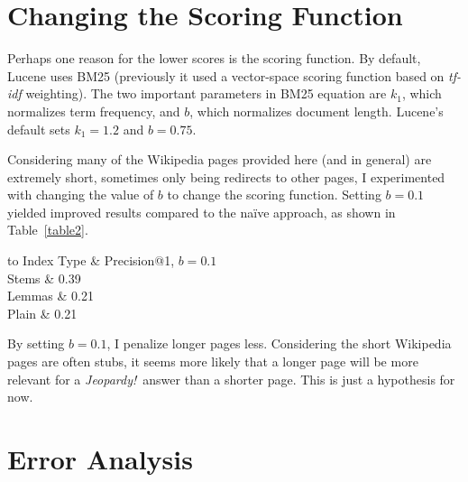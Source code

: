 \documentclass[11pt,letterpaper]{article}
\begin{document}
\section{Changing the Scoring Function}

Perhaps one reason for the lower scores is the scoring function.
By default, Lucene uses BM25 (previously it used a vector-space scoring function based on \textit{tf-idf} weighting).
The two important parameters in BM25 equation are $k_1$, which normalizes term frequency, and $b$, which normalizes document length.
Lucene's default sets $k_1 = 1.2$ and $b = 0.75$.


Considering many of the Wikipedia pages provided here (and in general) are extremely short, sometimes only being redirects to other pages, I experimented with changing the value of $b$ to change the scoring function.
Setting $b = 0.1$ yielded improved results compared to the na\"ive approach, as shown in Table~\ref{table2}.


\begin{table}[h!]
	\begin{center}
		\begin{tabu} to \textwidth {cc}\toprule
			Index Type & Precision@1, $b=0.1$ \\ \midrule
			Stems & 0.39 \\
			Lemmas & 0.21 \\
			Plain & 0.21 \\\bottomrule
		\end{tabu}
		\caption{Results with modified BM25 scoring. Results are Precision at 1 out of 100 test sentences.}
		\label{table2}
	\end{center}
\end{table}


By setting $b = 0.1$, I penalize longer pages less.
Considering the short Wikipedia pages are often stubs, it seems more likely that a longer page will be more relevant for a \textit{Jeopardy!}~answer than a shorter page. This is just a hypothesis for now.


\section{Error Analysis}
\end{document}
